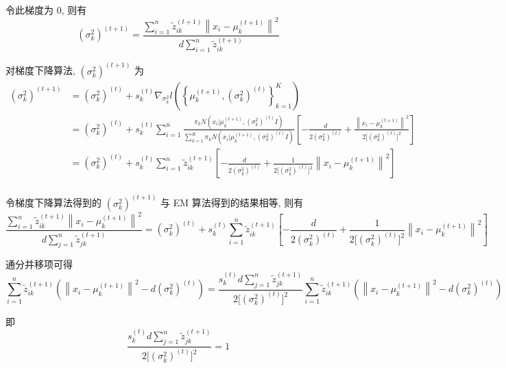 \documentclass[openany]{ctexbook}
\theoremstyle{kaiti}
\theoremstyle{normal}
\begin{document}
令此梯度为 0, 则有
\begin{equation}
  (\sigma_k^2)^{(t+1)}=\frac{\displaystyle\sum_{i=1}^n\tilde{z}_{ik}^{(t+1)}\left\|x_i-\mu_k^{(t+1)}\right\|^2}{\displaystyle d\sum_{i=1}^n\tilde{z}_{ik}^{(t+1)}}
\end{equation}

对梯度下降算法, $(\sigma_k^2)^{(t+1)}$ 为
\begin{equation}
  \begin{aligned}
    (\sigma_k^2)^{(t+1)}
    &=(\sigma_k ^2)^{(t)}+s_k^{(t)}\nabla_{\sigma_k^2}l\left(\left\{\mu_k^{(t+1)},(\sigma_k^2)^{(t)}\right\}_{k=1}^K\right)\\
    &=(\sigma_k^2)^{(t)}+s_k^{(t)}\sum_{i=1}^n \frac{\pi_k N\left(x_i\Big|\mu_k^{(t+1)},(\sigma_k^2)^{(t)}I\right)}{\displaystyle\sum_{k=1}^K\pi_k N\left(x_i\Big|\mu_k^{(t+1)},(\sigma_k^2)^{(t)}I\right)}\left[-\frac{d}{2(\sigma_k^2)^{(t)}}+\frac{\left\|x_i-\mu_k^{(t+1)}\right\|^2}{2\big[(\sigma_k^2)^{(t)}\big]^2}\right]\\
    &=(\sigma_k ^2)^{(t)}+s_k^{(t)}\sum_{i=1}^n \tilde{z}_{ik}^{(t+1)}\left[-\frac{d}{2(\sigma_k^2)^{(t)}}+\frac{1}{2\big[(\sigma_k^2)^{(t)}\big]^2}\left\|x_i-\mu_k^{(t+1)}\right\|^2\right]\\
  \end{aligned}
\end{equation}

令梯度下降算法得到的 $(\sigma_k^2)^{(t+1)}$ 与 EM 算法得到的结果相等, 则有
\begin{equation}
  \frac{\displaystyle\sum_{i=1}^n\tilde{z}_{ik}^{(t+1)}\left\|x_i-\mu_k^{(t+1)}\right\|^2}{\displaystyle d\sum_{j=1}^n\tilde{z}_{jk}^{(t+1)}}
  =(\sigma_k ^2)^{(t)}+s_k^{(t)}\sum_{i=1}^n \tilde{z}_{ik}^{(t+1)}\left[-\frac{d}{2(\sigma_k^2)^{(t)}}+\frac{1}{2\big[(\sigma_k^2)^{(t)}\big]^2}\left\|x_i-\mu_k^{(t+1)}\right\|^2\right]
\end{equation}

通分并移项可得
\begin{equation}
  \sum_{i=1}^n\tilde{z}_{ik}^{(t+1)}\left(\left\|x_i-\mu_k^{(t+1)}\right\|^2-d(\sigma_k ^2)^{(t)}\right)
  =\frac{\displaystyle s_k^{(t)}d\sum_{j=1}^n\tilde{z}_{jk}^{(t+1)}}{2\big[(\sigma_k^2)^{(t)}\big]^2}\sum_{i=1}^n\tilde{z}_{ik}^{(t+1)}\left(\left\|x_i-\mu_k^{(t+1)}\right\|^2-d(\sigma_k ^2)^{(t)}\right)
\end{equation}

即
\begin{equation}
  \frac{\displaystyle s_k^{(t)}d\sum_{j=1}^n\tilde{z}_{jk}^{(t+1)}}{2\big[(\sigma_k^2)^{(t)}\big]^2}=1
\end{equation}
\end{document}
